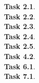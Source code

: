 \documentclass[11pt]{article}
\newcommand{\task}[1]{\clearpage\textbf{Task #1}. \\[0.5em]}
\newcommand{\eeq}{\cong}
\newcommand{\code}[2][]{{\sloppy
\ifmmode
    \text{\lstinline[language=sml,style=15150code,#1]`#2`}
\else
    {\lstinline[language=sml,style=15150code,#1]`#2`}%
\fi}}
\newcommand{\codefile}[2][]{}
\begin{document}





\task{2.1}

\task{2.2}

\task{2.3}

\task{2.4}

\task{2.5}

\task{4.2}

\task{6.1}

\task{7.1}
\end{document}
